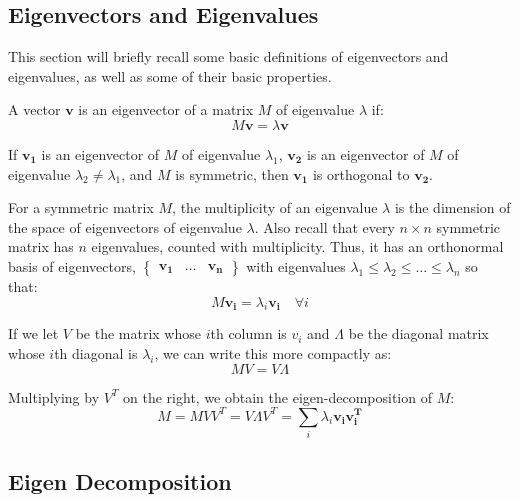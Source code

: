 \subsection{Eigenvectors and Eigenvalues}
\label{vectorsAndMatrices:eigen}
This section will briefly recall some basic definitions of eigenvectors and
eigenvalues, as well as some of their basic properties.

A vector $\mathbf{v}$ is an eigenvector of a matrix $M$ of eigenvalue $\lambda$
if:
\begin{equation}
M\mathbf{v} = \lambda\textbf{v}
\end{equation}

If $\mathbf{v_{1}}$ is an eigenvector of $M$ of eigenvalue $\lambda_{1}$,
$\mathbf{v_{2}}$ is an eigenvector of $M$ of eigenvalue $\lambda_{2} \neq
\lambda_{1}$, and $M$ is symmetric, then $\mathbf{v_{1}}$ is orthogonal to
$\mathbf{v_{2}}$.

For a symmetric matrix $M$, the multiplicity of an eigenvalue $\lambda$ is the
dimension of the space of eigenvectors of eigenvalue $\lambda$. Also recall that
every $n{\times}n$ symmetric matrix has $n$ eigenvalues, counted with
multiplicity. Thus, it has an orthonormal basis of eigenvectors,
$\begin{Bmatrix} \mathbf{v_{1}} & \ldots & \mathbf{v_{n}} \end{Bmatrix}$ with
eigenvalues $\lambda_{1} \leq \lambda_{2} \leq \ldots \leq \lambda_{n}$ so that:
\begin{equation}
M\mathbf{v_{i}} = \lambda_{i}\mathbf{v_{i}} \quad \forall i
\end{equation}

If we let $V$ be the matrix whose $i$th column is $v_{i}$ and $\Lambda$ be the
diagonal matrix whose $i$th diagonal is $\lambda_{i}$, we can write this more
compactly as:
\begin{equation}
MV = V\Lambda
\end{equation}

Multiplying by $V^{T}$ on the right, we obtain the eigen-decomposition of $M$:
\begin{equation}
M = MVV^{T} = V{\Lambda}V^{T} = \sum_{i} \lambda_{i}\mathbf{v_{i}}\mathbf{v_{i}^{T}}
\end{equation}

\subsection{Eigen Decomposition}
\label{vectorsAndMatrices:eigenDecomposition}

